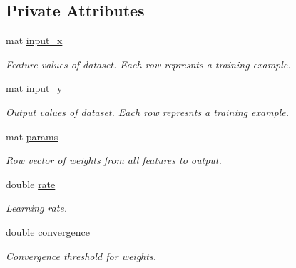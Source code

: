 \subsection*{Private Attributes}
\begin{DoxyCompactItemize}
\item 
\mbox{\label{classLogisticClassifier_ad3f18efeaafc8fd284963ac2b38f5d07}} 
mat \hyperlink{classLogisticClassifier_ad3f18efeaafc8fd284963ac2b38f5d07}{input\+\_\+x}
\begin{DoxyCompactList}\small\item\em Feature values of dataset. Each row represnts a training example. \end{DoxyCompactList}\item 
\mbox{\label{classLogisticClassifier_ac9ce18c07d568b2926b12cfe410f5e82}} 
mat \hyperlink{classLogisticClassifier_ac9ce18c07d568b2926b12cfe410f5e82}{input\+\_\+y}
\begin{DoxyCompactList}\small\item\em Output values of dataset. Each row represnts a training example. \end{DoxyCompactList}\item 
\mbox{\label{classLogisticClassifier_a66fc430960d74c35485aec08838592ba}} 
mat \hyperlink{classLogisticClassifier_a66fc430960d74c35485aec08838592ba}{params}
\begin{DoxyCompactList}\small\item\em Row vector of weights from all features to output. \end{DoxyCompactList}\item 
\mbox{\label{classLogisticClassifier_ad76ca658c4f90baacc5f9fe00172c339}} 
double \hyperlink{classLogisticClassifier_ad76ca658c4f90baacc5f9fe00172c339}{rate}
\begin{DoxyCompactList}\small\item\em Learning rate. \end{DoxyCompactList}\item 
\mbox{\label{classLogisticClassifier_adccf9527c27e9c1fedc3702246fad6a6}} 
double \hyperlink{classLogisticClassifier_adccf9527c27e9c1fedc3702246fad6a6}{convergence}
\begin{DoxyCompactList}\small\item\em Convergence threshold for weights. \end{DoxyCompactList}\item 

\end{DoxyCompactItemize}

